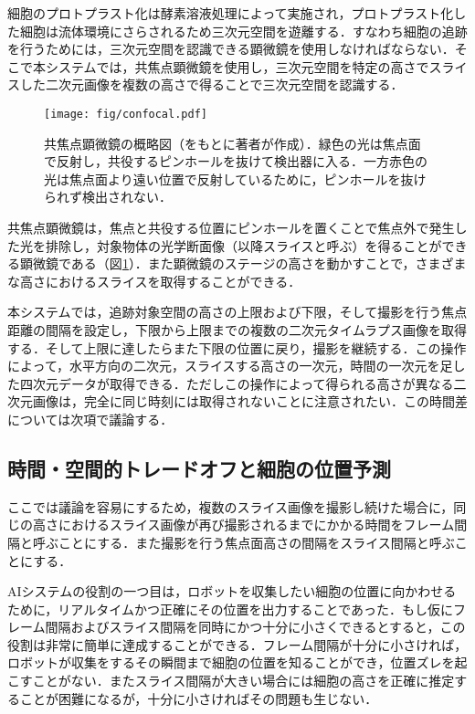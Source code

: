     細胞のプロトプラスト化は酵素溶液処理によって実施され，プロトプラスト化した細胞は流体環境にさらされるため三次元空間を遊離する．すなわち細胞の追跡を行うためには，三次元空間を認識できる顕微鏡を使用しなければならない．そこで本システムでは，共焦点顕微鏡\cite{paddock2000principles}を使用し，三次元空間を特定の高さでスライスした二次元画像を複数の高さで得ることで三次元空間を認識する．

    \begin{figure}[t]
        \centering
        \texttt{[image: fig/confocal.pdf]}
        \caption[共焦点顕微鏡の概略図]{共焦点顕微鏡の概略図（\cite{paddock2000principles}をもとに著者が作成）．緑色の光は焦点面で反射し，共役するピンホールを抜けて検出器に入る．一方赤色の光は焦点面より遠い位置で反射しているために，ピンホールを抜けられず検出されない．}
        \label{fig:confocal_microscope}
    \end{figure}

    共焦点顕微鏡は，焦点と共役する位置にピンホールを置くことで焦点外で発生した光を排除し，対象物体の光学断面像（以降スライスと呼ぶ）を得ることができる顕微鏡である（図\ref{fig:confocal_microscope}）．また顕微鏡のステージの高さを動かすことで，さまざまな高さにおけるスライスを取得することができる．

    本システムでは，追跡対象空間の高さの上限および下限，そして撮影を行う焦点距離の間隔を設定し，下限から上限までの複数の二次元タイムラプス画像を取得する．そして上限に達したらまた下限の位置に戻り，撮影を継続する．この操作によって，水平方向の二次元，スライスする高さの一次元，時間の一次元を足した四次元データが取得できる．ただしこの操作によって得られる高さが異なる二次元画像は，完全に同じ時刻には取得されないことに注意されたい．この時間差については次項で議論する．

    \subsection{時間・空間的トレードオフと細胞の位置予測}

    ここでは議論を容易にするため，複数のスライス画像を撮影し続けた場合に，同じの高さにおけるスライス画像が再び撮影されるまでにかかる時間をフレーム間隔と呼ぶことにする．また撮影を行う焦点面高さの間隔をスライス間隔と呼ぶことにする．

    AIシステムの役割の一つ目は，ロボットを収集したい細胞の位置に向かわせるために，リアルタイムかつ正確にその位置を出力することであった．もし仮にフレーム間隔およびスライス間隔を同時にかつ十分に小さくできるとすると，この役割は非常に簡単に達成することができる．フレーム間隔が十分に小さければ，ロボットが収集をするその瞬間まで細胞の位置を知ることができ，位置ズレを起こすことがない．またスライス間隔が大きい場合には細胞の高さを正確に推定することが困難になるが，十分に小さければその問題も生じない．


